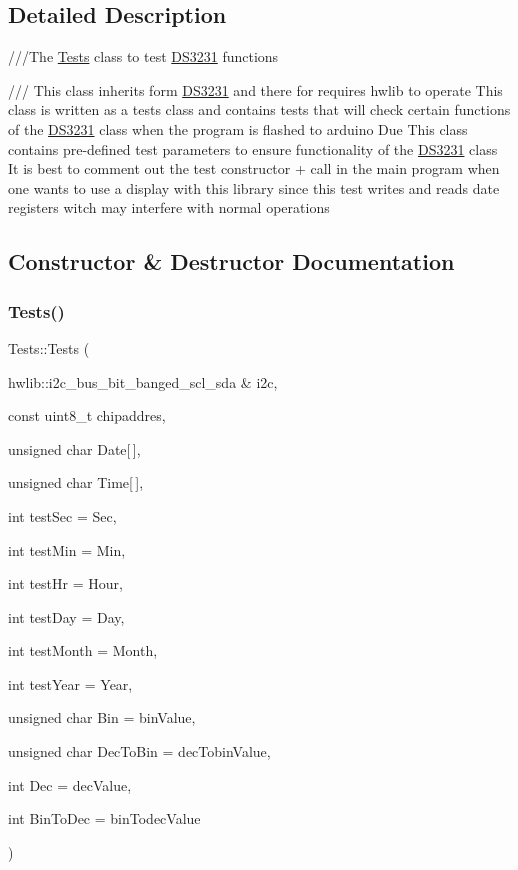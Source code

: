 \subsection{Detailed Description}
///\+The \hyperlink{classTests}{Tests} class to test \hyperlink{classDS3231}{D\+S3231} functions 

/// This class inherits form \hyperlink{classDS3231}{D\+S3231} and there for requires hwlib to operate This class is written as a tests class and contains tests that will check certain functions of the \hyperlink{classDS3231}{D\+S3231} class when the program is flashed to arduino Due This class contains pre-\/defined test parameters to ensure functionality of the \hyperlink{classDS3231}{D\+S3231} class It is best to comment out the test constructor + call in the main program when one wants to use a display with this library since this test writes and reads date registers witch may interfere with normal operations 

\subsection{Constructor \& Destructor Documentation}
\mbox{\label{classTests_afc34127a38f4366f6a014ae65e10ee57}} 
\subsubsection{\texorpdfstring{Tests()}{Tests()}}
{\footnotesize\ttfamily Tests\+::\+Tests (\begin{DoxyParamCaption}\item[{hwlib\+::i2c\+\_\+bus\+\_\+bit\+\_\+banged\+\_\+scl\+\_\+sda \&}]{i2c,  }\item[{const uint8\+\_\+t}]{chipaddres,  }\item[{unsigned char}]{Date\mbox{[}$\,$\mbox{]},  }\item[{unsigned char}]{Time\mbox{[}$\,$\mbox{]},  }\item[{int}]{test\+Sec = {\ttfamily Sec},  }\item[{int}]{test\+Min = {\ttfamily Min},  }\item[{int}]{test\+Hr = {\ttfamily Hour},  }\item[{int}]{test\+Day = {\ttfamily Day},  }\item[{int}]{test\+Month = {\ttfamily Month},  }\item[{int}]{test\+Year = {\ttfamily Year},  }\item[{unsigned char}]{Bin = {\ttfamily binValue},  }\item[{unsigned char}]{Dec\+To\+Bin = {\ttfamily decTobinValue},  }\item[{int}]{Dec = {\ttfamily decValue},  }\item[{int}]{Bin\+To\+Dec = {\ttfamily binTodecValue} }\end{DoxyParamCaption})}



